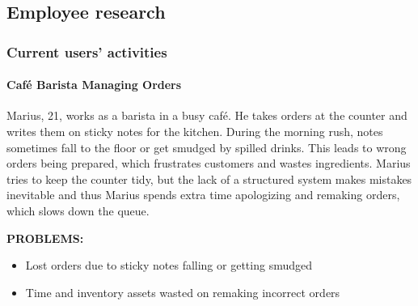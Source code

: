 \documentclass[]{VUMIFTemplateClass}
\newcommand{\yellowcomment}[1]{%
    \begin{tcolorbox}[colback=yellow!80, colframe=yellow!80, arc=0pt, outer arc=0pt, boxrule=0pt, left=3pt, right=3pt, top=3pt, bottom=3pt]
        \textbf{\textcolor{red}{COMMENT:}} #1
    \end{tcolorbox}
}
\newcommand{\noticecomment}[1]{%
    \begin{tcolorbox}[colback=blue!20, colframe=blue!60, arc=0pt, outer arc=0pt, boxrule=1pt, left=3pt, right=3pt, top=3pt, bottom=3pt]
        \textbf{\textcolor{blue!70!black}{NOTE:}} #1
    \end{tcolorbox}
}
\newcommand{\subsubsubsection}[1]{\paragraph{#1}}
\begin{document}



\subsection{Employee research}

\subsubsection{Current users' activities}

\subsubsubsection{Café Barista Managing Orders}
\label{subsubsubsec:barista-orders}

Marius, 21, works as a barista in a busy café. He takes orders at the counter
and writes them on sticky notes for the kitchen. During the morning rush, notes
sometimes fall to the floor or get smudged by spilled drinks. This leads to
wrong orders being prepared, which frustrates customers and wastes ingredients.
Marius tries to keep the counter tidy, but the lack of a structured system makes
mistakes inevitable and thus Marius spends extra time apologizing and remaking
orders, which slows down the queue.


\textbf{PROBLEMS:}

\begin{itemize}
    \item Lost orders due to sticky notes falling or getting smudged
    \item Time and inventory assets wasted on remaking incorrect orders
\end{itemize}
\end{document}
